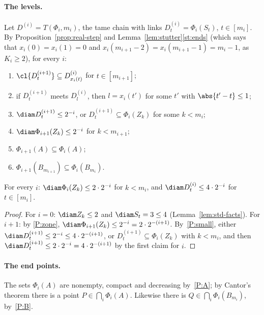 \paragraph{The levels.} Let $D^{(i)}=T(\Phi_i,m_i)$, the tame chain with links
$D^{(i)}_t=\Phi_i(S_t)$, $t\in[m_i]$. By Proposition~\ref{prop:real-step} and
Lemma~\ref{lem:stutter}\ref{st:ends} (which says that $x_i(0)=x_i(1)=0$ and
$x_i(m_{i+1}-2)=x_i(m_{i+1}-1)=m_i-1$, as $K_i\ge2$), for every $i$:
\begin{enumerate}[label=(P\arabic*)]
\item\label{P:follow} $\cl{D^{(i+1)}_t}\subseteq D^{(i)}_{x_i(t)}$ for $t\in[m_{i+1}]$;
\item\label{P:tight} if $D^{(i+1)}_t$ meets $D^{(i)}_l$, then $l=x_i(t')$ for some $t'$ with
$\abs{t'-t}\le1$;
\item\label{P:small} $\diam D^{(i+1)}_t\le2^{-i}$, or $D^{(i+1)}_t\subseteq\Phi_i(Z_k)$ for some $k<m_i$;
\item\label{P:zone} $\diam\Phi_{i+1}(Z_k)\le2^{-i}$ for $k<m_{i+1}$;
\item\label{P:A} $\Phi_{i+1}(A)\subseteq\Phi_i(A)$;
\item\label{P:B} $\Phi_{i+1}(B_{m_{i+1}})\subseteq\Phi_i(B_{m_i})$.
\end{enumerate}


\begin{lemma}[Mesh]\label{lem:mesh}
For every $i$: $\diam\Phi_i(Z_k)\le2\cdot2^{-i}$ for $k<m_i$, and $\diam D^{(i)}_t\le4\cdot2^{-i}$
for $t\in[m_i]$.
\end{lemma}

\begin{proof}
For $i=0$: $\diam Z_k\le2$ and $\diam S_t=3\le4$ (Lemma~\ref{lem:std-facts}). For $i+1$: by
\ref{P:zone}, $\diam\Phi_{i+1}(Z_k)\le2^{-i}=2\cdot2^{-(i+1)}$. By~\ref{P:small}, either
$\diam D^{(i+1)}_t\le2^{-i}\le4\cdot2^{-(i+1)}$, or $D^{(i+1)}_t\subseteq\Phi_i(Z_k)$ with $k<m_i$,
and then $\diam D^{(i+1)}_t\le2\cdot2^{-i}=4\cdot2^{-(i+1)}$ by the first claim for $i$.
\end{proof}


\paragraph{The end points.} The sets $\Phi_i(A)$ are nonempty, compact and decreasing by~\ref{P:A};
by Cantor's theorem there is a point $P\in\bigcap_i\Phi_i(A)$. Likewise there is
$Q\in\bigcap_i\Phi_i(B_{m_i})$, by~\ref{P:B}.

